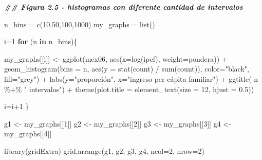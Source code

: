 \documentclass[
]{book}
\newenvironment{Shaded}{\begin{snugshade}}{\end{snugshade}}
\newcommand{\AttributeTok}[1]{\textcolor[rgb]{0.77,0.63,0.00}{#1}}
\newcommand{\ControlFlowTok}[1]{\textcolor[rgb]{0.13,0.29,0.53}{\textbf{#1}}}
\newcommand{\DecValTok}[1]{\textcolor[rgb]{0.00,0.00,0.81}{#1}}
\newcommand{\DocumentationTok}[1]{\textcolor[rgb]{0.56,0.35,0.01}{\textbf{\textit{#1}}}}
\newcommand{\FloatTok}[1]{\textcolor[rgb]{0.00,0.00,0.81}{#1}}
\newcommand{\FunctionTok}[1]{\textcolor[rgb]{0.00,0.00,0.00}{#1}}
\newcommand{\NormalTok}[1]{#1}
\newcommand{\OtherTok}[1]{\textcolor[rgb]{0.56,0.35,0.01}{#1}}
\newcommand{\SpecialCharTok}[1]{\textcolor[rgb]{0.00,0.00,0.00}{#1}}
\newcommand{\StringTok}[1]{\textcolor[rgb]{0.31,0.60,0.02}{#1}}
\begin{document}
\begin{Shaded}
\begin{Highlighting}[]
\DocumentationTok{\#\# Figura 2.5 {-} histogramas con diferente cantidad de intervalos}

\NormalTok{n\_bins }\OtherTok{=} \FunctionTok{c}\NormalTok{(}\DecValTok{10}\NormalTok{,}\DecValTok{50}\NormalTok{,}\DecValTok{100}\NormalTok{,}\DecValTok{1000}\NormalTok{)}
\NormalTok{my\_graphs }\OtherTok{=} \FunctionTok{list}\NormalTok{()}

\NormalTok{i}\OtherTok{=}\DecValTok{1}
\ControlFlowTok{for}\NormalTok{ (n }\ControlFlowTok{in}\NormalTok{ n\_bins)\{}
  
\NormalTok{    my\_graphs[[i]] }\OtherTok{\textless{}{-}} \FunctionTok{ggplot}\NormalTok{(mex06, }
                           \FunctionTok{aes}\NormalTok{(}\AttributeTok{x=}\FunctionTok{log}\NormalTok{(ipcf), }\AttributeTok{weight=}\NormalTok{pondera)) }\SpecialCharTok{+} 
                   \FunctionTok{geom\_histogram}\NormalTok{(}\AttributeTok{bins =}\NormalTok{ n, }\FunctionTok{aes}\NormalTok{(}\AttributeTok{y =} \FunctionTok{stat}\NormalTok{(count) }\SpecialCharTok{/} \FunctionTok{sum}\NormalTok{(count)),}
                               \AttributeTok{color=}\StringTok{"black"}\NormalTok{, }\AttributeTok{fill=}\StringTok{"grey"}\NormalTok{) }\SpecialCharTok{+}
                   \FunctionTok{labs}\NormalTok{(}\AttributeTok{y=}\StringTok{"proporción"}\NormalTok{, }\AttributeTok{x=}\StringTok{"ingreso per cápita familiar"}\NormalTok{) }\SpecialCharTok{+}
                   \FunctionTok{ggtitle}\NormalTok{( n }\SpecialCharTok{\%+\%} \StringTok{" intervalos"}\NormalTok{) }\SpecialCharTok{+}
                   \FunctionTok{theme}\NormalTok{(}\AttributeTok{plot.title =} \FunctionTok{element\_text}\NormalTok{(}\AttributeTok{size =} \DecValTok{12}\NormalTok{, }\AttributeTok{hjust =} \FloatTok{0.5}\NormalTok{))}

\NormalTok{  i}\OtherTok{=}\NormalTok{i}\SpecialCharTok{+}\DecValTok{1}  
\NormalTok{\}}

\NormalTok{g1 }\OtherTok{\textless{}{-}}\NormalTok{  my\_graphs[[}\DecValTok{1}\NormalTok{]]}
\NormalTok{g2 }\OtherTok{\textless{}{-}}\NormalTok{  my\_graphs[[}\DecValTok{2}\NormalTok{]]}
\NormalTok{g3 }\OtherTok{\textless{}{-}}\NormalTok{  my\_graphs[[}\DecValTok{3}\NormalTok{]]}
\NormalTok{g4 }\OtherTok{\textless{}{-}}\NormalTok{  my\_graphs[[}\DecValTok{4}\NormalTok{]]}

\FunctionTok{library}\NormalTok{(gridExtra)}
\FunctionTok{grid.arrange}\NormalTok{(g1, g2, g3, g4, }\AttributeTok{ncol=}\DecValTok{2}\NormalTok{, }\AttributeTok{nrow=}\DecValTok{2}\NormalTok{)}
\end{Highlighting}
\end{Shaded}
\end{document}
